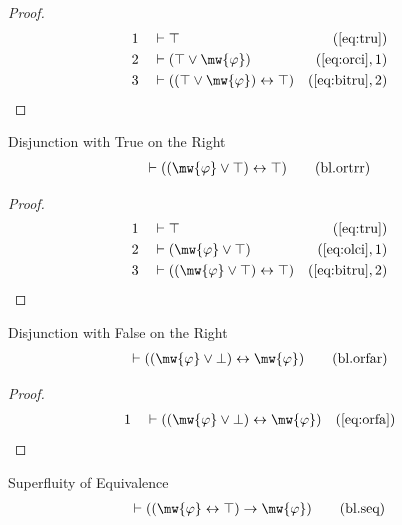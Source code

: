 \begin{proof}
\begin{align}
  1 &&  & \vdash \top&(\mbox{\ref{eq:tru}})\notag
  \\ 2 &&  & \vdash ( \top \vee \mw{\varphi} )&(\mbox{\ref{eq:orci}},1)\notag
  \\ 3 &&  & \vdash ( ( \top \vee \mw{\varphi} ) \leftrightarrow \top
     )&(\mbox{\ref{eq:bitru}},2)\notag
\end{align}
\end{proof}

\begin{lemma} {Disjunction with True on the Right}
\begin{align}
\vdash ( ( \mw{\varphi} \vee \top ) \leftrightarrow \top
    )\label{eq:bl.ortrr}\tag{bl.ortrr}
\end{align}
\end{lemma}


\begin{proof}
\begin{align}
  1 &&  & \vdash \top&(\mbox{\ref{eq:tru}})\notag
  \\ 2 &&  & \vdash ( \mw{\varphi} \vee \top )&(\mbox{\ref{eq:olci}},1)\notag
  \\ 3 &&  & \vdash ( ( \mw{\varphi} \vee \top ) \leftrightarrow \top
     )&(\mbox{\ref{eq:bitru}},2)\notag
\end{align}
\end{proof}

\begin{lemma} {Disjunction with False on the Right}
\begin{align}
\vdash ( ( \mw{\varphi} \vee \bot ) \leftrightarrow \mw{\varphi}
    )\label{eq:bl.orfar}\tag{bl.orfar}
\end{align}
\end{lemma}


\begin{proof}
\begin{align}
  1 &&  & \vdash ( ( \mw{\varphi} \vee \bot ) \leftrightarrow \mw{\varphi}
     )&(\mbox{\ref{eq:orfa}})\notag
\end{align}
\end{proof}

\begin{lemma} {Superfluity of Equivalence}
\begin{align}
\vdash ( ( \mw{\varphi} \leftrightarrow \top ) \rightarrow \mw{\varphi}
    )\label{eq:bl.seq}\tag{bl.seq}
\end{align}
\end{lemma}


